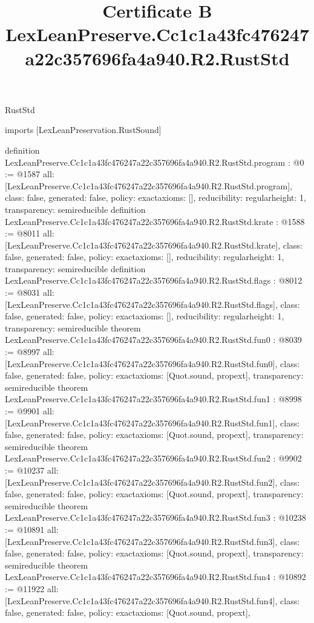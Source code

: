 \begin{lexlean}{RustStd}
\title{Certificate B LexLeanPreserve.Cc1c1a43fc476247a22c357696fa4a940.R2.RustStd}
\begin{coremodule}
imports [LexLeanPreservation.RustSound]

definition LexLeanPreserve.Cc1c1a43fc476247a22c357696fa4a940.R2.RustStd.program : @0 := @1587 {
  all: [LexLeanPreserve.Cc1c1a43fc476247a22c357696fa4a940.R2.RustStd.program],
  class: false,
  generated: false,
  policy: exact{axioms: []},
  reducibility: regular{height: 1},
  transparency: semireducible
}
definition LexLeanPreserve.Cc1c1a43fc476247a22c357696fa4a940.R2.RustStd.krate : @1588 := @8011 {
  all: [LexLeanPreserve.Cc1c1a43fc476247a22c357696fa4a940.R2.RustStd.krate],
  class: false,
  generated: false,
  policy: exact{axioms: []},
  reducibility: regular{height: 1},
  transparency: semireducible
}
definition LexLeanPreserve.Cc1c1a43fc476247a22c357696fa4a940.R2.RustStd.flags : @8012 := @8031 {
  all: [LexLeanPreserve.Cc1c1a43fc476247a22c357696fa4a940.R2.RustStd.flags],
  class: false,
  generated: false,
  policy: exact{axioms: []},
  reducibility: regular{height: 1},
  transparency: semireducible
}
theorem LexLeanPreserve.Cc1c1a43fc476247a22c357696fa4a940.R2.RustStd.fun0 : @8039 := @8997 {
  all: [LexLeanPreserve.Cc1c1a43fc476247a22c357696fa4a940.R2.RustStd.fun0],
  class: false,
  generated: false,
  policy: exact{axioms: [Quot.sound, propext]},
  transparency: semireducible
}
theorem LexLeanPreserve.Cc1c1a43fc476247a22c357696fa4a940.R2.RustStd.fun1 : @8998 := @9901 {
  all: [LexLeanPreserve.Cc1c1a43fc476247a22c357696fa4a940.R2.RustStd.fun1],
  class: false,
  generated: false,
  policy: exact{axioms: [Quot.sound, propext]},
  transparency: semireducible
}
theorem LexLeanPreserve.Cc1c1a43fc476247a22c357696fa4a940.R2.RustStd.fun2 : @9902 := @10237 {
  all: [LexLeanPreserve.Cc1c1a43fc476247a22c357696fa4a940.R2.RustStd.fun2],
  class: false,
  generated: false,
  policy: exact{axioms: [Quot.sound, propext]},
  transparency: semireducible
}
theorem LexLeanPreserve.Cc1c1a43fc476247a22c357696fa4a940.R2.RustStd.fun3 : @10238 := @10891 {
  all: [LexLeanPreserve.Cc1c1a43fc476247a22c357696fa4a940.R2.RustStd.fun3],
  class: false,
  generated: false,
  policy: exact{axioms: [Quot.sound, propext]},
  transparency: semireducible
}
theorem LexLeanPreserve.Cc1c1a43fc476247a22c357696fa4a940.R2.RustStd.fun4 : @10892 := @11922 {
  all: [LexLeanPreserve.Cc1c1a43fc476247a22c357696fa4a940.R2.RustStd.fun4],
  class: false,
  generated: false,
  policy: exact{axioms: [Quot.sound, propext]},
}
\end{coremodule}
\end{lexlean}
